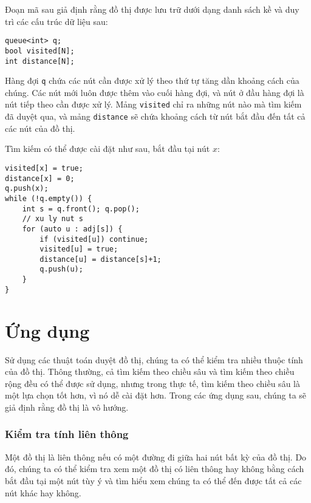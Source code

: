 Đoạn mã sau giả định rằng đồ thị được lưu trữ
dưới dạng danh sách kề và duy trì các
cấu trúc dữ liệu sau:
\begin{lstlisting}
queue<int> q;
bool visited[N];
int distance[N];
\end{lstlisting}

Hàng đợi \texttt{q}
chứa các nút cần được xử lý
theo thứ tự tăng dần khoảng cách của chúng.
Các nút mới luôn được thêm vào cuối
hàng đợi, và nút ở đầu
hàng đợi là nút tiếp theo cần được xử lý.
Mảng \texttt{visited} chỉ ra
những nút nào mà tìm kiếm đã duyệt qua,
và mảng \texttt{distance} sẽ chứa
khoảng cách từ nút bắt đầu đến tất cả các nút của đồ thị.

Tìm kiếm có thể được cài đặt như sau,
bắt đầu tại nút $x$:
\begin{lstlisting}
visited[x] = true;
distance[x] = 0;
q.push(x);
while (!q.empty()) {
    int s = q.front(); q.pop();
    // xu ly nut s
    for (auto u : adj[s]) {
        if (visited[u]) continue;
        visited[u] = true;
        distance[u] = distance[s]+1;
        q.push(u);
    }
}
\end{lstlisting}

\section{Ứng dụng}

Sử dụng các thuật toán duyệt đồ thị,
chúng ta có thể kiểm tra nhiều thuộc tính của đồ thị.
Thông thường, cả tìm kiếm theo chiều sâu và
tìm kiếm theo chiều rộng đều có thể được sử dụng,
nhưng trong thực tế, tìm kiếm theo chiều sâu
là một lựa chọn tốt hơn, vì nó
dễ cài đặt hơn.
Trong các ứng dụng sau, chúng ta sẽ
giả định rằng đồ thị là vô hướng.

\subsubsection{Kiểm tra tính liên thông}


Một đồ thị là liên thông nếu có một đường đi
giữa hai nút bất kỳ của đồ thị.
Do đó, chúng ta có thể kiểm tra xem một đồ thị có liên thông hay không
bằng cách bắt đầu tại một nút tùy ý và
tìm hiểu xem chúng ta có thể đến được tất cả các nút khác hay không.


